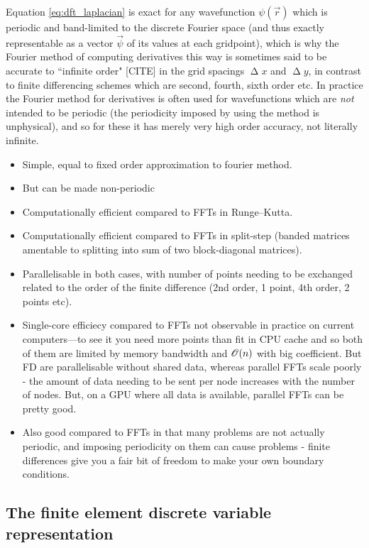 Equation \eqref{eq:dft_laplacian} is exact for any wavefunction $\psi(\vec r)$ which is periodic and band-limited to the discrete Fourier space (and thus exactly representable as a vector $\vec \psi$ of its values at each gridpoint), which is why the Fourier method of computing derivatives this way is sometimes said to be accurate to ``infinite order" [CITE] in the grid spacings $\upDelta x$ and $\upDelta y$, in contrast to finite differencing schemes which are second, fourth, sixth order etc. In practice the Fourier method for derivatives is often used for wavefunctions which are \emph{not} intended to be periodic (the periodicity imposed by using the method is unphysical), and so for these it has merely very high order accuracy, not literally infinite. 

\begin{itemize}
    \item Simple, equal to fixed order approximation to fourier method.
    \item But can be made non-periodic
    \item Computationally efficient compared to FFTs in Runge--Kutta.
    \item Computationally efficient compared to FFTs in split-step (banded matrices amentable to splitting into sum of two block-diagonal matrices).
    \item Parallelisable in both cases, with number of points needing to be exchanged related to the order of the finite difference (2nd order, 1 point, 4th order, 2 points etc).
    \item Single-core efficiecy compared to FFTs not observable in practice on current computers---to see it you need more points than fit in CPU cache and so both of them are limited by memory bandwidth and $\mathscr{O}(n)$ with big coefficient. But FD are parallelisable without shared data, whereas parallel FFTs scale poorly - the amount of data needing to be sent per node increases with the number of nodes. But, on a GPU where all data is available, parallel FFTs can be pretty good.
    \item Also good compared to FFTs in that many problems are not actually periodic, and imposing periodicity on them can cause problems - finite differences give you a fair bit of freedom to make your own boundary conditions.
\end{itemize}

\subsection{The finite element discrete variable representation}

